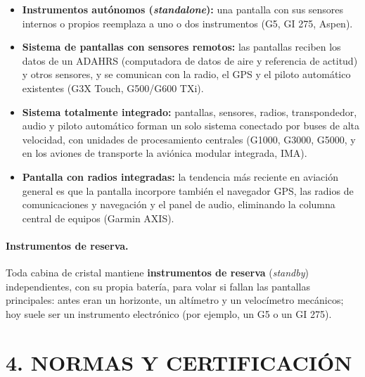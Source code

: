 \begin{itemize}
  \item \textbf{Instrumentos autónomos (\textit{standalone}):} una pantalla con sus sensores
        internos o propios reemplaza a uno o dos instrumentos (G5, GI 275, Aspen).
  \item \textbf{Sistema de pantallas con sensores remotos:} las pantallas reciben los datos de un
        ADAHRS (computadora de datos de aire y referencia de actitud) y otros sensores, y se
        comunican con la radio, el GPS y el piloto automático existentes (G3X Touch, G500/G600
        TXi).
  \item \textbf{Sistema totalmente integrado:} pantallas, sensores, radios, transpondedor, audio y
        piloto automático forman un solo sistema conectado por buses de alta velocidad, con
        unidades de procesamiento centrales (G1000, G3000, G5000, y en los aviones de transporte la
        aviónica modular integrada, IMA).
  \item \textbf{Pantalla con radios integradas:} la tendencia más reciente en aviación general es
        que la pantalla incorpore también el navegador GPS, las radios de comunicaciones y
        navegación y el panel de audio, eliminando la columna central de equipos (Garmin AXIS).
\end{itemize}

\paragraph*{Instrumentos de reserva.} Toda cabina de cristal mantiene \textbf{instrumentos de
reserva} (\textit{standby}) independientes, con su propia batería, para volar si fallan las
pantallas principales: antes eran un horizonte, un altímetro y un velocímetro mecánicos; hoy suele
ser un instrumento electrónico (por ejemplo, un G5 o un GI 275).

\section*{4. NORMAS Y CERTIFICACIÓN}

